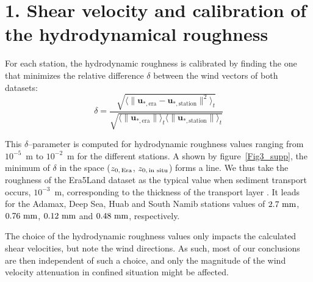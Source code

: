 \section*{1. Shear velocity and calibration of the hydrodynamical roughness}
\label{calib_z0}

For each station, the hydrodynamic roughness is calibrated by finding the one that minimizes the relative difference $\delta$ between the wind vectors of both datasets:
\begin{equation}
  \label{metric_roughness}
      \delta = \frac{\sqrt{\langle\| \boldsymbol{u}_{*, \textrm{era}} - \boldsymbol{u}_{*, \textrm{station}} \|^{2}\rangle_{t}}}{\sqrt{ \langle \| \boldsymbol{u}_{*, \textrm{era}} \| \rangle_{t}\langle \| \boldsymbol{u}_{*, \textrm{station}} \| \rangle_{t}}}
\end{equation}

This $\delta$--parameter is computed for hydrodynamic roughness values ranging from $10^{-5}$~m to $10^{-2}$~m for the different stations. A shown by figure~\ref{Fig3_supp}, the minimum of $\delta$ in the space ($z_{0,\, \textup{Era}}$, $z_{0,\, \textup{in situ}}$) forms a line. We thus take the roughness of the Era5Land dataset as the typical value when sediment transport occurs, $10^{-3}$~m, corresponding to the thickness of the transport layer \citep{Duran2011}. It leads for the Adamax, Deep Sea, Huab and South Namib stations values of $2.7~\textup{mm}$, $0.76~\textup{mm}$, $0.12~\textup{mm}$ and $0.48~\textup{mm}$, respectively.

The choice of the hydrodynamic roughness values only impacts the calculated shear velocities, but note the wind directions. As such, most of our conclusions are then independent of such a choice, and only the magnitude of the wind velocity attenuation in confined situation might be affected.


